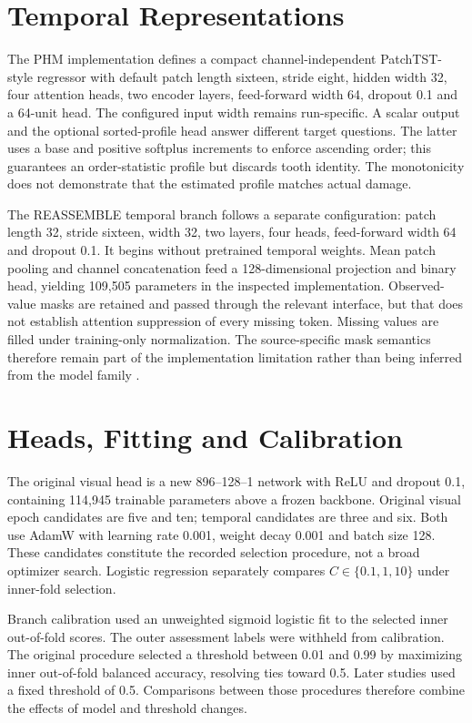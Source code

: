\section{Temporal Representations}
The PHM implementation defines a compact channel-independent PatchTST-style regressor
with default patch length sixteen, stride eight, hidden width 32, four attention heads,
two encoder layers, feed-forward width 64, dropout 0.1 and a 64-unit head. The
configured input width remains run-specific. A scalar output and the optional
sorted-profile head answer different target questions. The latter uses a base and
positive softplus increments to enforce ascending order; this guarantees an
order-statistic profile but discards tooth identity. The monotonicity does not
demonstrate that the estimated profile matches actual damage.

The REASSEMBLE temporal branch follows a separate configuration: patch length 32, stride
sixteen, width 32, two layers, four heads, feed-forward width 64 and dropout 0.1. It
begins without pretrained temporal weights. Mean patch pooling and channel concatenation
feed a 128-dimensional projection and binary head, yielding 109,505 parameters in the
inspected implementation. Observed-value masks are retained and passed through the
relevant interface, but that does not establish attention suppression of every missing
token. Missing values are filled under training-only normalization. The source-specific
mask semantics therefore remain part of the implementation limitation rather than being
inferred from the model family \citep{Nie2023PatchTST}.

\section{Heads, Fitting and Calibration}
The original visual head is a new 896--128--1 network with ReLU and dropout 0.1,
containing 114,945 trainable parameters above a frozen backbone. Original visual epoch
candidates are five and ten; temporal candidates are three and six. Both use AdamW with
learning rate 0.001, weight decay 0.001 and batch size 128. These candidates constitute
the recorded selection procedure, not a broad optimizer search. Logistic regression
separately compares $C\in\{0.1,1,10\}$ under inner-fold selection.

Branch calibration used an unweighted sigmoid logistic fit to the selected inner
out-of-fold scores. The outer assessment labels were withheld from calibration. The
original procedure selected a threshold between 0.01 and 0.99 by maximizing inner
out-of-fold balanced accuracy, resolving ties toward 0.5. Later studies used a fixed
threshold of 0.5. Comparisons between those procedures therefore combine the effects of
model and threshold changes.

